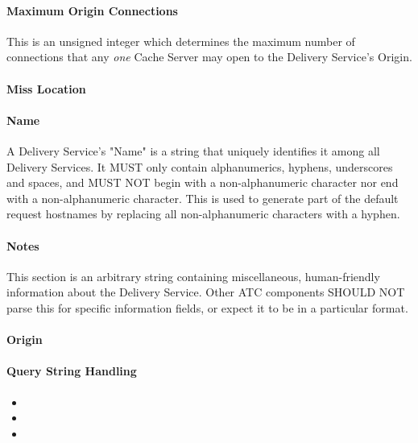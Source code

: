 \paragraph{Maximum Origin Connections}
This is an unsigned integer which determines the maximum number of connections
that any \emph{one} Cache Server may open to the Delivery Service's Origin.


\paragraph{Miss Location}

\paragraph{Name}
A Delivery Service's "Name" is a string that uniquely identifies it among all
Delivery Services. It MUST only contain alphanumerics, hyphens, underscores and
spaces, and MUST NOT begin with a non-alphanumeric character nor end with a
non-alphanumeric character. This is used to generate part of the default request
hostnames by replacing all non-alphanumeric characters with a hyphen.

\paragraph{Notes}
This section is an arbitrary string containing miscellaneous, human-friendly
information about the Delivery Service. Other ATC components SHOULD NOT parse
this for specific information fields, or expect it to be in a particular format.

\paragraph{Origin}

\paragraph{Query String Handling}

\begin{itemize}
	\item {}
	\item {}
	\item {}
\end{itemize}

